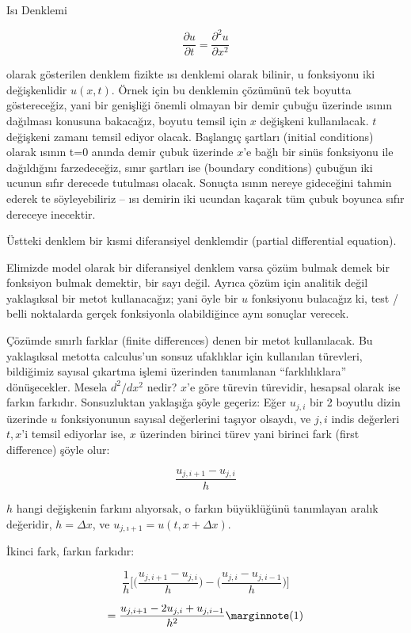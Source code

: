 \documentclass[12pt,fleqn]{article}\usepackage{../../common}
\begin{document}
Isı Denklemi

$$ \frac{\partial u}{\partial t} = \frac{\partial^2u}{\partial x^2} $$

olarak gösterilen denklem fizikte ısı denklemi olarak bilinir, u fonksiyonu
iki değişkenlidir $u(x,t)$. Örnek için bu denklemin çözümünü tek boyutta
göstereceğiz, yani bir genişliği önemli olmayan bir demir çubuğu üzerinde
ısının dağılması konusuna bakacağız, boyutu temsil için $x$ değişkeni
kullanılacak. $t$ değişkeni zamanı temsil ediyor olacak. Başlangıç şartları
(initial conditions) olarak ısının t=0 anında demir çubuk üzerinde $x$'e
bağlı bir sinüs fonksiyonu ile dağıldığını farzedeceğiz, sınır şartları ise
(boundary conditions) çubuğun iki ucunun sıfır derecede tutulması
olacak. Sonuçta ısının nereye gideceğini tahmin ederek te söyleyebiliriz --
ısı demirin iki ucundan kaçarak tüm çubuk boyunca sıfır dereceye inecektir.

Üstteki denklem bir kısmi diferansiyel denklemdir (partial differential 
equation).

Elimizde model olarak bir diferansiyel denklem varsa çözüm bulmak demek bir
fonksiyon bulmak demektir, bir sayı değil. Ayrıca çözüm için analitik değil
yaklaşıksal bir metot kullanacağız; yani öyle bir $u$ fonksiyonu bulacağız
ki, test / belli noktalarda gerçek fonksiyonla olabildiğince aynı sonuçlar
verecek.

Çözümde sınırlı farklar (finite differences) denen bir metot
kullanılacak. Bu yaklaşıksal metotta calculus'un sonsuz ufaklıklar için
kullanılan türevleri, bildiğimiz sayısal çıkartma işlemi üzerinden
tanımlanan ``farklılıklara'' dönüşecekler. Mesela $d^2/dx^2$ nedir? $x$'e
göre türevin türevidir, hesapsal olarak ise farkın farkıdır. Sonsuzluktan
yaklaşığa şöyle geçeriz: Eğer $u_{j,i}$ bir 2 boyutlu dizin üzerinde $u$
fonksiyonunun sayısal değerlerini taşıyor olsaydı, ve $j, i$ indis
değerleri $t, x$'i temsil ediyorlar ise, $x$ üzerinden birinci türev yani
birinci fark (first difference) şöyle olur:

$$ \frac{u_{j,i+1}-u_{j,i}}{h} $$

$h$ hangi değişkenin farkını alıyorsak, o farkın büyüklüğünü
tanımlayan aralık değeridir, $h=\Delta x$, ve $u_{j,ı+1} = u(t,x +
\Delta x)$.

İkinci fark, farkın farkıdır:

$$
\frac{1}{h}
\bigg[
\bigg( \frac{u_{j,i+1}-u_{j,i}}{h} \bigg) -
\bigg( \frac{u_{j,i}-u_{j,i-1}}{h} \bigg)
\bigg] 
$$

$$
= \frac{u_{j,i+1}-2u_{j,i}+u_{j,i-1}}{h^2} 
\mlabel{1}
$$
\end{document}

